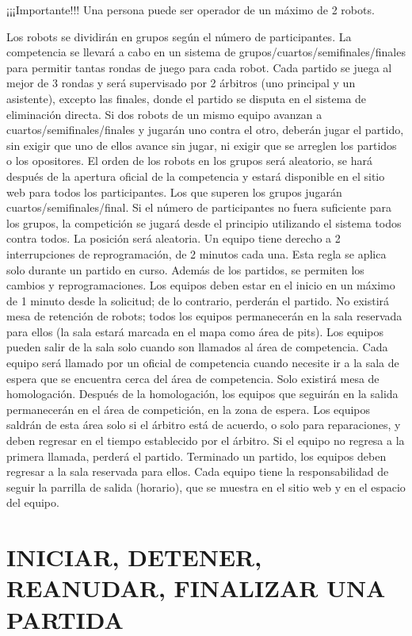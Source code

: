 \documentclass[
  letterpaper,
  DIV=11,
  numbers=noendperiod]{scrreprt}
\begin{document}
¡¡¡Importante!!! Una persona puede ser operador de un máximo de 2
robots.

Los robots se dividirán en grupos según el número de participantes. La
competencia se llevará a cabo en un sistema de
grupos/cuartos/semifinales/finales para permitir tantas rondas de juego
para cada robot. Cada partido se juega al mejor de 3 rondas y será
supervisado por 2 árbitros (uno principal y un asistente), excepto las
finales, donde el partido se disputa en el sistema de eliminación
directa. Si dos robots de un mismo equipo avanzan a
cuartos/semifinales/finales y jugarán uno contra el otro, deberán jugar
el partido, sin exigir que uno de ellos avance sin jugar, ni exigir que
se arreglen los partidos o los opositores. El orden de los robots en los
grupos será aleatorio, se hará después de la apertura oficial de la
competencia y estará disponible en el sitio web para todos los
participantes. Los que superen los grupos jugarán
cuartos/semifinales/final. Si el número de participantes no fuera
suficiente para los grupos, la competición se jugará desde el principio
utilizando el sistema todos contra todos. La posición será aleatoria. Un
equipo tiene derecho a 2 interrupciones de reprogramación, de 2 minutos
cada una. Esta regla se aplica solo durante un partido en curso. Además
de los partidos, se permiten los cambios y reprogramaciones. Los equipos
deben estar en el inicio en un máximo de 1 minuto desde la solicitud; de
lo contrario, perderán el partido. No existirá mesa de retención de
robots; todos los equipos permanecerán en la sala reservada para ellos
(la sala estará marcada en el mapa como área de pits). Los equipos
pueden salir de la sala solo cuando son llamados al área de competencia.
Cada equipo será llamado por un oficial de competencia cuando necesite
ir a la sala de espera que se encuentra cerca del área de competencia.
Solo existirá mesa de homologación. Después de la homologación, los
equipos que seguirán en la salida permanecerán en el área de
competición, en la zona de espera. Los equipos saldrán de esta área solo
si el árbitro está de acuerdo, o solo para reparaciones, y deben
regresar en el tiempo establecido por el árbitro. Si el equipo no
regresa a la primera llamada, perderá el partido. Terminado un partido,
los equipos deben regresar a la sala reservada para ellos. Cada equipo
tiene la responsabilidad de seguir la parrilla de salida (horario), que
se muestra en el sitio web y en el espacio del equipo.

\section{INICIAR, DETENER, REANUDAR, FINALIZAR UNA
PARTIDA}\label{iniciar-detener-reanudar-finalizar-una-partida}
\end{document}
